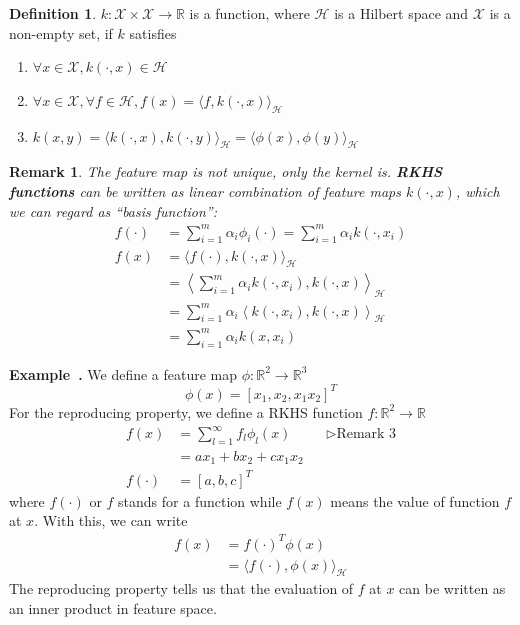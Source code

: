 \documentclass[a4paper]{article}
\theoremstyle{definition}
\newtheorem{definition}{Definition}
\theoremstyle{plain}
\newtheorem{remark}{Remark}
\newenvironment{example}[1][]{\refstepcounter{example}\par\medskip
   \noindent \textbf{Example~\theexample. #1} \rmfamily}{\medskip}
\newcounter{example}{Example}
\begin{document}
\begin{definition}
 $k:\mathcal{X}\times\mathcal{X}\rightarrow\mathbb{R}$ is a function, where $\mathcal{H}$ is a Hilbert space and $\mathcal{X}$ is a non-empty set, if $k$ satisfies
\begin{enumerate}
    \item $\forall x\in \mathcal{X},k(\cdot,x)\in\mathcal{H}$
    \item $\forall x\in\mathcal{X},\forall f\in\mathcal{H},f(x)=\langle f,k(\cdot,x)\rangle_\mathcal{H}$
    \item $k(x,y)=\langle k(\cdot,x),k(\cdot,y)\rangle_\mathcal{H}=\langle \phi(x),\phi(y)\rangle_\mathcal{H}$
\end{enumerate}
\end{definition}

\begin{remark}
The feature map is not unique, only the kernel is. \textbf{RKHS functions} can be written as linear combination of feature maps $k(\cdot,x)$, which we can regard as ``basis function'':
\begin{align*}
    f(\cdot)&= \sum^m_{i=1}\alpha_i\phi_i(\cdot)=\sum^m_{i=1}\alpha_ik(\cdot,x_i)\\
    f(x)&=\langle f(\cdot),k(\cdot,x)\rangle_\mathcal{H}\\
    &=\left< \sum^m_{i=1}\alpha_ik(\cdot,x_i),k(\cdot,x)\right>_\mathcal{H}\\
    &= \sum^m_{i=1}\alpha_i\left<k(\cdot,x_i),k(\cdot,x)\right>_\mathcal{H}\\
    &= \sum^m_{i=1}\alpha_ik(x,x_i)
\end{align*}
\end{remark}

\begin{example}
We define a feature map $\phi:\mathbb{R}^2\rightarrow\mathbb{R}^3$
\begin{equation*}
    \phi(x)=[x_1,x_2,x_1x_2]^T
\end{equation*}
For the reproducing property, we define a RKHS function $f:\mathbb{R}^2\rightarrow\mathbb{R}$
\begin{align*}
    f(x)&=\sum^\infty_{l=1}f_l\phi_l(x) && \triangleright\text{Remark 3}\\
    &=ax_1+bx_2+cx_1x_2\\
    f(\cdot)&=[a, b, c]^T 
\end{align*}
where $f(\cdot)$ or $f$ stands for a function while $f(x)$ means the value of function $f$ at $x$.
With this, we can write
\begin{align*}
    f(x)&=f(\cdot)^T\phi(x)\\
    &=\langle f(\cdot),\phi(x)\rangle_\mathcal{H}
\end{align*}
The reproducing property tells us that the evaluation of $f$ at $x$ can be written as an inner product in feature space.
\end{example}
\end{document}
